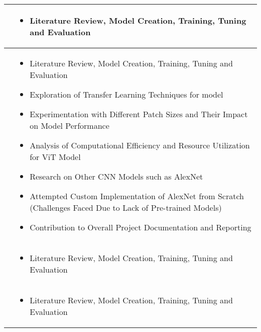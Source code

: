 \begin{longtable}{p{5cm}|p{9.5cm}}
    \nameref{ss:lhsj} &
        \begin{itemize}
            \item \nameref{s:vit} Literature Review, Model Creation, Training, Tuning and Evaluation
        \end{itemize}\\
        \hline

    \nameref{ss:lhsj} &
    \begin{itemize}
        \item \nameref{s:vit} Literature Review, Model Creation, Training, Tuning and Evaluation
        \item Exploration of Transfer Learning Techniques for \nameref{s:vit} model
        \item Experimentation with Different Patch Sizes and Their Impact on Model Performance
        \item Analysis of Computational Efficiency and Resource Utilization for ViT Model
        \item Research on Other CNN Models such as AlexNet
        \item Attempted Custom Implementation of AlexNet from Scratch (Challenges Faced Due to Lack of Pre-trained Models)
        \item Contribution to Overall Project Documentation and Reporting
    \end{itemize}\\
    \hline
    
    \nameref{ss:ozxm} &
        \begin{itemize}
            \item \nameref{s:xception} Literature Review, Model Creation, Training, Tuning and Evaluation
        \end{itemize}\\
        \hline
    
    \nameref{ss:ctsh} &
        \begin{itemize}
            \item \nameref{s:densenet121} Literature Review, Model Creation, Training, Tuning and Evaluation
        \end{itemize}\\
    \hline
\end{longtable}
